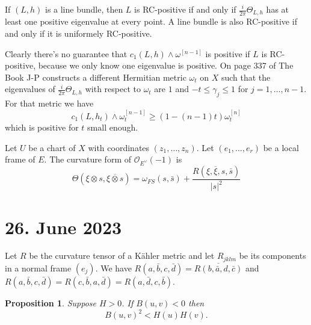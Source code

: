 \documentclass[11pt]{article}
\newtheorem{prop}[theo]{Proposition}
\theoremstyle{definition}
\newcommand{\cc}[1]{\mathcal{#1}}
\def\^#1{^{[#1]}}
\def\ov#1{\overline{#1}}
\begin{document}
If $(L,h)$ is a line bundle, then $L$ is RC-positive if and only if $\frac
i{2\pi} \Theta_{L,h}$ has at least one positive eigenvalue at every point.
A line bundle is also RC-positive if and only if it is uniformely RC-positive.

Clearly there's no guarantee that $c_1(L,h) \wedge \omega\^{n-1}$ is positive
if $L$ is RC-positive, because we only know one eigenvalue is positive.
On page 337 of The Book J-P constructs a different Hermitian metric $\omega_t$
on $X$ such that the eigenvalues of $\frac{i}{2\pi}\Theta_{L,h}$ with respect
to $\omega_t$ are $1$ and $-t \leq \gamma_j \leq 1$ for $j
= 1, \ldots, n-1$. For that metric we have
$$
c_1(L,h_t) \wedge \omega_t\^{n-1} \geq (1-(n-1)t) \omega_t\^n
$$
which is positive for $t$ small enough.


Let $U$ be a chart of $X$ with coordinates $(z_1, \ldots, z_n)$.
Let $(e_1, \ldots, e_r)$ be a local frame of $E$.
The curvature form of $\cc O_{E^\vee}(-1)$ is
$$
\Theta(\xi \otimes s, \ov{\xi \otimes s})
= \omega_{FS}(s, \bar s) + \frac{R(\xi, \ov\xi, s, \bar s)}{|s|^2}
$$


\section{26. June 2023}

Let $R$ be the curvature tensor of a K\"ahler metric and let $R_{jklm}$ be
its components in a normal frame $(e_j)$.
We have $R(a, \bar b, c, \bar d) = \ov{R(b, \bar a, d, \bar c)}$
and $R(a, \bar b, c, \bar d) = R(c, \bar b, a, \bar d) = R(a, \bar d, c, \bar b)$.

\begin{prop}
Suppose $H > 0$. If $B(u,v) < 0$ then
$$
B(u,v)^2 < H(u) H(v).
$$
\end{prop}
\end{document}

